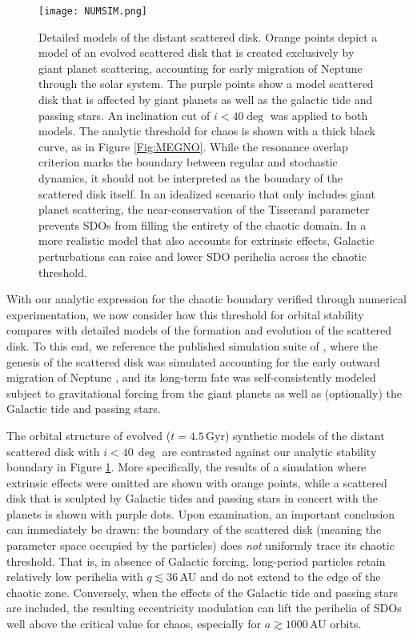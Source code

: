 \documentclass[twocolumn]{aastex62}
\begin{document}
\begin{figure}[t]
\centering
\texttt{[image: NUMSIM.png]}
\caption{Detailed models of the distant scattered disk. Orange points depict a model of an evolved scattered disk that is created exclusively by giant planet scattering, accounting for early migration of Neptune through the solar system. The purple points show a model scattered disk that is affected by giant planets as well as the galactic tide and passing stars. An inclination cut of $i<40\deg$ was applied to both models. The analytic threshold for chaos is shown with a thick black curve, as in Figure \ref{Fig:MEGNO}. While the resonance overlap criterion marks the boundary between regular and stochastic dynamics, it should not be interpreted as the boundary of the scattered disk itself. In an idealized scenario that only includes giant planet scattering, the near-conservation of the Tisserand parameter prevents SDOs from filling the entirety of the chaotic domain. In a more realistic model that also accounts for extrinsic effects, Galactic perturbations can raise and lower SDO perihelia across the chaotic threshold.}
\label{Fig:NUMSIM}
\end{figure}

With our analytic expression for the chaotic boundary verified through numerical experimentation, we now consider how this threshold for orbital stability compares with detailed models of the formation and evolution of the scattered disk. To this end, we reference the published simulation suite of \citet{Nesvorny2017}, where the genesis of the scattered disk was simulated accounting for the early outward migration of Neptune \citep{2005Natur.435..459T,2011ApJ...738...13B, 2016ApJ...825...94N}, and its long-term fate was self-consistently modeled subject to gravitational forcing from the giant planets as well as (optionally) the Galactic tide and passing stars.

The orbital structure of evolved ($t=4.5\,$Gyr) synthetic models of the distant scattered disk with $i<40\,\deg$ are contrasted against our analytic stability boundary in Figure \ref{Fig:NUMSIM}. More specifically, the results of a simulation where extrinsic effects were omitted are shown with orange points, while a scattered disk that is sculpted by Galactic tides and passing stars in concert with the planets is shown with purple dots. Upon examination, an important conclusion can immediately be drawn: the boundary of the scattered disk (meaning the parameter space occupied by the particles) does \textit{not} uniformly trace its chaotic threshold. That is, in absence of Galactic forcing, long-period particles retain relatively low perihelia with $q\lesssim36\,$AU and do not extend to the edge of the chaotic zone. Conversely, when the effects of the Galactic tide and passing stars are included, the resulting eccentricity modulation can lift the perihelia of SDOs well above the critical value for chaos, especially for $a\gtrsim1000\,$AU orbits.
\end{document}
